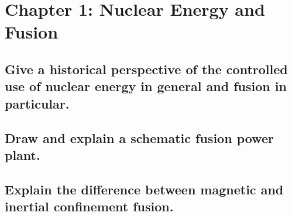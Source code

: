 \section{Chapter 1: Nuclear Energy and Fusion}

\subsection{Give a historical perspective of the controlled use of nuclear energy in general and fusion in particular.}
\solutionblock{}

\subsection{Draw and explain a schematic fusion power plant.}
\solutionblock{}

\subsection{Explain the difference between magnetic and inertial confinement fusion.}
\solutionblock{}
